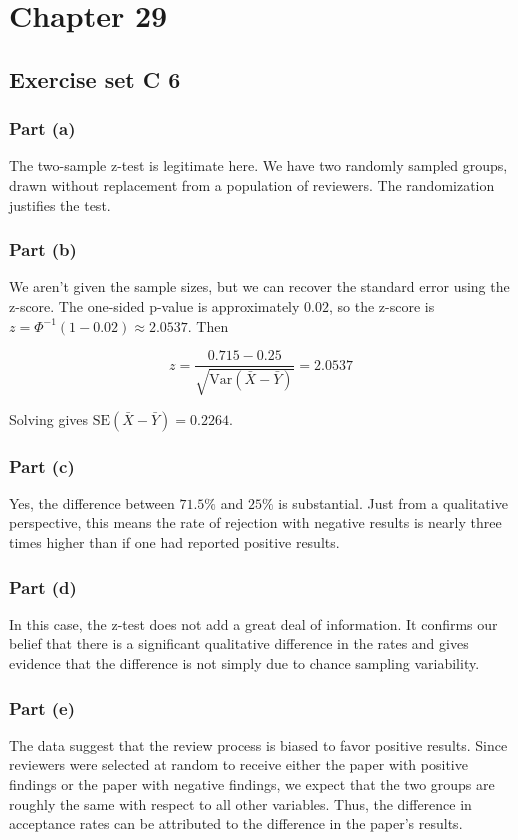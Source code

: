 \documentclass[11pt]{article}
\newcommand{\var}{\textrm{Var}}
\begin{document}
\section*{Chapter 29}
\subsection*{Exercise set C 6} %
\subsubsection*{Part (a)}
The two-sample z-test is legitimate here.  We have two randomly sampled groups, drawn without replacement from a population of reviewers.  The randomization justifies the test.

\subsubsection*{Part (b)}
We aren't given the sample sizes, but we can recover the standard error using the z-score.  The one-sided p-value is approximately $0.02$, so the z-score is $z = \Phi^{-1}(1 - 0.02) \approx 2.0537$.  Then

$$ z = \frac{0.715 - 0.25}{\sqrt{\var(\bar{X} - \bar{Y})}} = 2.0537$$

Solving gives $\text{SE}(\bar{X} - \bar{Y}) = 0.2264$.

\subsubsection*{Part (c)}
Yes, the difference between $71.5\%$ and $25\%$ is substantial.  Just from a qualitative perspective, this means the rate of rejection with negative results is nearly three times higher than if one had reported positive results.


\subsubsection*{Part (d)}
In this case, the z-test does not add a great deal of information.  It confirms our belief that there is a significant qualitative difference in the rates and gives evidence that the difference is not simply due to chance sampling variability.

\subsubsection*{Part (e)}
The data suggest that the review process is biased to favor positive results.  Since reviewers were selected at random to receive either the paper with positive findings or the paper with negative findings, we expect that the two groups are roughly the same with respect to all other variables.  Thus, the difference in acceptance rates can be attributed to the difference in the paper's results.
\end{document}
